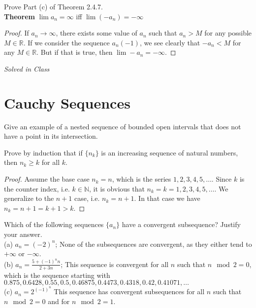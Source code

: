\documentclass[12pt]{book}
\newcommand{\N}{\mathbb{N}}
\newcommand{\R}{\mathbb{R}}
\newenvironment{exercise}[2][Exercise]{\begin{trivlist}
\item[\hskip \labelsep {\bfseries #1}\hskip \labelsep {\bfseries #2.}]}{\end{trivlist}}
\begin{document}
\begin{exercise}{2.4.11}
Prove Part (c) of Theorem 2.4.7. \\
 	\textbf{Theorem} $\lim a_n = \infty$ iff $\lim(-a_n)= -\infty $
 	
 	\begin{proof}
 	If $a_n \to \infty$, there exists some value of $a_n$ such that $a_n > M$ for any possible $M\in\R$. If we consider the sequence $a_n (-1)$, we see clearly that $-a_n < M$ for any $M\in\R$. But if that is true, then $\lim -a_n= -\infty$.
 	\end{proof}
\end{exercise}

\begin{exercise}{2.4.14}
\emph{Solved in Class}
\end{exercise}



\section{Cauchy Sequences}

\begin{exercise}{2.5.1}
Give an example of a nested sequence of bounded open intervals that does not have a point in its intersection.
\end{exercise}

\begin{exercise}{2.5.4}
Prove by induction that if $\{n_k\}$ is an increasing sequence of natural numbers, then $n_k \geq k$ for all $k$.
	\begin{proof}
	Assume the base case $n_k=n$, which is the series $1,2,3,4,5,\hdots$. Since $k$ is the counter index, i.e. $k \in \N$, it is obvious that $n_k = k = 1,2,3,4,5, \hdots$. We generalize to the $n+1$ case, i.e. $n_k = n+1$. In that case we have $n_k = n+1 = k+1 > k$.
	\end{proof}
\end{exercise}


\begin{exercise}{2.5.5}
Which of the following sequences $\{a_n \}$ have a convergent subsequence? Justify your answer. \\
(a) $a_n= (-2)^n$; None of the subsequences are convergent, as they either tend to $+\infty$ or $-\infty$.\\
(b) $a_n = \frac{5+(-1)^n n}{2+3n}$; This sequence is convergent for all $n$ such that $n\mod 2=0$, which is the sequence starting with $0.875, 0.6428, 0.55, 0.5, 0.46875, 0.4473, 0.4318, 0.42, 0.41071, \hdots$\\
(c) $a_n=2^{(-1)^n}$ This sequence has convergent subsequences for all $n$ such that $n\mod 2=0$ and for $n \mod 2 = 1$.
\end{exercise}
\end{document}
